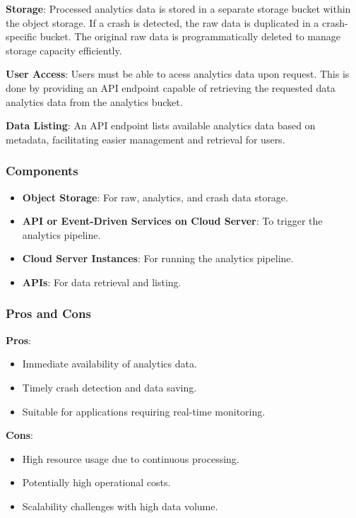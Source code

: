 \textbf{Storage}:  
Processed analytics data is stored in a separate storage bucket within the object storage. If a crash is detected, the raw data is duplicated in a crash-specific bucket. The original raw data is programmatically deleted to manage storage capacity efficiently.

\textbf{User Access}:  
Users must be able to acess analytics data upon request. This is done by providing an API endpoint capable of retrieving the requested data analytics data from the analytics bucket. 

\textbf{Data Listing}:  
An API endpoint lists available analytics data based on metadata, facilitating easier management and retrieval for users.

\subsubsection{Components}
\begin{itemize}
    \item \textbf{Object Storage}: For raw, analytics, and crash data storage.
    \item \textbf{API or Event-Driven Services on Cloud Server}: To trigger the analytics pipeline.
    \item \textbf{Cloud Server Instances}: For running the analytics pipeline.
    \item \textbf{APIs}: For data retrieval and listing.
\end{itemize}

\subsubsection{Pros and Cons}

\textbf{Pros}:
\begin{itemize}
    \item Immediate availability of analytics data.
    \item Timely crash detection and data saving.
    \item Suitable for applications requiring real-time monitoring.
\end{itemize}

\textbf{Cons}:
\begin{itemize}
    \item High resource usage due to continuous processing.
    \item Potentially high operational costs.
    \item Scalability challenges with high data volume.
\end{itemize}

